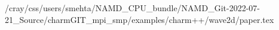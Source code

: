 /cray/css/users/smehta/NAMD_CPU_bundle/NAMD_Git-2022-07-21_Source/charmGIT_mpi_smp/examples/charm++/wave2d/paper.tex